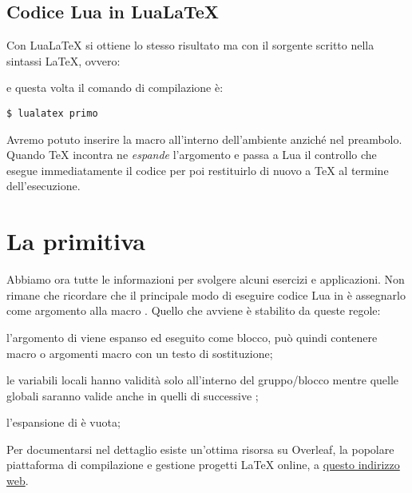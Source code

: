 \subsection{Codice Lua in Lua\LaTeX}
\label{iSecLuaInLuaLaTeX}

Con Lua\LaTeX{} si ottiene lo stesso risultato ma con il sorgente scritto nella
sintassi \LaTeX, ovvero:
e questa volta il comando di compilazione è:
\begin{Verbatim}[numbers=none]
$ lualatex primo
\end{Verbatim}

Avremo potuto inserire la macro all'interno dell'ambiente  anziché
nel preambolo. Quando \TeX{} incontra  ne \emph{espande}
l'argomento e passa a Lua il controllo che esegue immediatamente il codice per
poi restituirlo di nuovo a \TeX{} al termine dell'esecuzione.


\section{La primitiva }
\label{iSecDirectLua}

Abbiamo ora tutte le informazioni per svolgere alcuni esercizi e applicazioni.
Non rimane che ricordare che il principale modo di eseguire codice Lua in
\LuaTeX{} è assegnarlo come argomento alla macro . Quello che
avviene è stabilito da queste regole:
\begin{compactenumerate}
\item l'argomento di  viene espanso ed eseguito come blocco, può
quindi contenere macro o argomenti macro con un testo di sostituzione;

\item le variabili locali hanno validità solo all'interno del gruppo/blocco
mentre quelle globali saranno valide anche in quelli di successive
;

\item l'espansione di  è vuota;
\end{compactenumerate}

Per documentarsi nel dettaglio esiste un'ottima risorsa su Overleaf, la popolare
piattaforma di compilazione e gestione progetti \LaTeX{} online, a
\href{https://cs.overleaf.com/learn/latex/Articles/An_Introduction_to_LuaTeX_(Part_2):_Understanding_%5Cdirectlua}{questo indirizzo web}.


